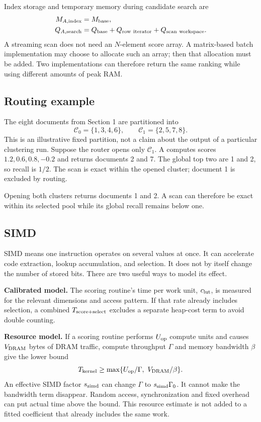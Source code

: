 Index storage and temporary memory during candidate search are
\begin{align}
M_{A,\rm index}&=\Mbase,\\
Q_{A,\rm search}&=\Qbase+Q_{\rm row\ iterator}+Q_{\rm scan\ workspace}.
\label{eq:scan-memory}
\end{align}
A streaming scan does not need an $N$-element score array. A matrix-based batch implementation
may choose to allocate such an array; then that allocation must be added. Two implementations can therefore return the same ranking while using different amounts of
peak RAM.

\subsection{Routing example}
The eight documents from Section 1 are partitioned into
\[
\mathcal C_0=\{1,3,4,6\},\qquad \mathcal C_1=\{2,5,7,8\}.
\]
This is an illustrative fixed partition, not a claim about the output of a particular
clustering run. Suppose the router opens only $\mathcal C_1$. A computes scores
$1.2,0.6,0.8,-0.2$ and returns documents 2 and 7. The global top two are 1 and 2, so recall is
$1/2$. The scan is exact within the opened cluster; document 1 is excluded by routing.

Opening both clusters returns documents 1 and 2. A scan can therefore be exact within its selected
pool while its global recall remains below one.

\subsection{SIMD}
SIMD means one instruction operates on several values at once. It can accelerate code extraction,
lookup accumulation, and selection. It does not by itself change the number of stored bits.
There are two useful ways to model its effect.

\textbf{Calibrated model.} The scoring routine's time per work unit,
$c_{\rm lut}$, is measured for the relevant dimensions and access pattern. If that rate already includes
selection, a combined $T_{\rm score+select}$ excludes a separate heap-cost term to avoid double counting.

\textbf{Resource model.} If a scoring routine performs $U_{\rm op}$ compute units and causes $V_{\rm DRAM}$ bytes of DRAM
traffic, compute throughput $\Gamma$ and memory bandwidth $\beta$ give the lower bound
\begin{equation}
T_{\rm kernel}\geq\max\{U_{\rm op}/\Gamma,\ V_{\rm DRAM}/\beta\}.
\label{eq:resource}
\end{equation}
An effective SIMD factor $s_{\rm simd}$ can change $\Gamma$ to $s_{\rm simd}\Gamma_0$.
It cannot make the bandwidth term disappear. Random access, synchronization and fixed overhead
can put actual time above the bound. This resource estimate is not added to a fitted
coefficient that already includes the same work.


